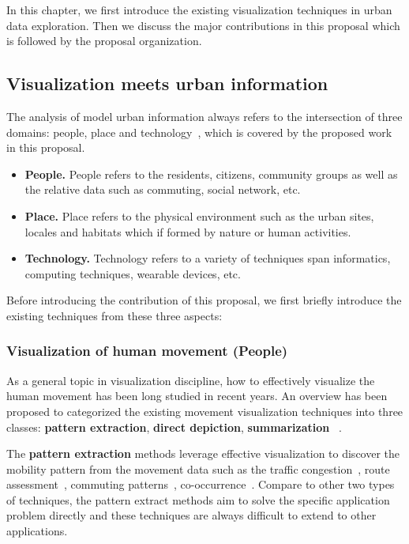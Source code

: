 In this chapter, we first introduce the existing visualization techniques in urban data exploration. Then we discuss the major contributions in this proposal which is followed by the proposal organization.

\subsection{Visualization meets urban information}

 
The analysis of model urban information always refers to the intersection of three domains: people, place and technology~\cite{foth2011urban}, which is covered by the proposed work in this proposal. 
\begin{itemize}
\item \textbf{People.} People refers to the residents, citizens, community groups as well as the relative data such as commuting, social network, etc.
\item \textbf{Place.} Place refers to the physical environment such as the urban sites, locales and habitats which if formed by nature or human activities.
\item \textbf{Technology.} Technology refers to a variety of techniques span informatics, computing techniques, wearable devices, etc.
\end{itemize}

Before introducing the contribution of this proposal, we first briefly introduce the existing techniques from these three aspects:

\subsubsection{Visualization of human movement (People)}
As a general topic in visualization discipline, how to effectively visualize the human movement has been long studied in recent years.  An overview has been proposed to categorized the existing movement visualization techniques into three classes: \textbf{pattern extraction}, \textbf{direct depiction}, \textbf{summarization} ~\cite{andrienko2013visual, wu2015telcovis}.

The \textbf{pattern extraction} methods leverage effective visualization to discover the mobility pattern from the movement data such as the traffic congestion~\cite{wang2013visual}, route assessment~\cite{wang2014visual, huang2015trajgraph}, commuting patterns~\cite{beecham2014studying, von2015mobilitygraphs}, co-occurrence~\cite{wu2015telcovis, ni2017spatio}. Compare to other two types of techniques, the pattern extract methods aim to solve the specific application problem directly and these techniques are always difficult to extend to other applications.

